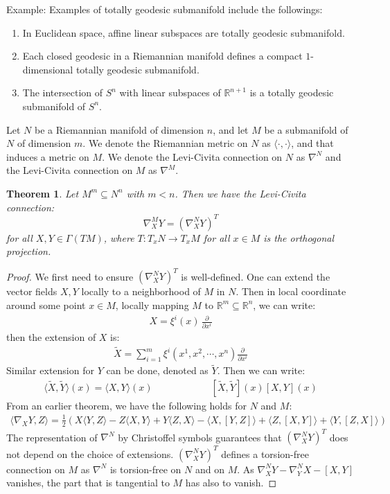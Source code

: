 \documentclass[11pt]{book}
\theoremstyle{break}
\theoremstyle{break}
\newtheorem{thm}{Theorem}[section]
\newcommand{\R}{\mathbb{R}}
\newcommand{\pd}{\partial}
\newcommand{\that}[1]{\widetilde{#1}}
\newcommand{\example}{\color{green}Example: \color{black}}
\begin{document}
\example Examples of totally geodesic submanifold include the followings:
\begin{enumerate}
\item In Euclidean space, affine linear subspaces are totally geodesic submanifold.
\item Each closed geodesic in a Riemannian manifold defines a compact $1$-dimensional totally geodesic submanifold. 
\item The intersection of $S^n$ with linear subspaces of $\R^{n+1}$ is a totally geodesic submanifold of $S^n$.  
\end{enumerate}


Let $N$ be a Riemannian manifold of dimension $n$, and let $M$ be a submanifold of $N$ of dimension $m$. We denote the Riemannian metric on $N$ as $\langle\cdot,\cdot\rangle$, and that induces a metric on $M$. We denote the Levi-Civita connection on $N$ as $\nabla^N$ and the Levi-Civita connection on $M$ as $\nabla^M$. 


\begin{thm}
Let $M^m \subseteq N^n$ with $m<n$. Then we have the Levi-Civita connection:
$$\nabla^M_XY = (\nabla_X^N Y)^T$$
for all $X,Y \in \Gamma(TM)$, where $T:T_xN \to T_xM$ for all $x \in M$ is the orthogonal projection. 
\end{thm}
\begin{proof}
We first need to ensure $(\nabla_X^N Y)^T$ is well-defined. One can extend the vector fields $X,Y$ locally to a neighborhood of $M$ in $N$. Then in local coordinate around some point $x \in M$, locally mapping $M$ to $\R^m \subseteq \R^n$, we can write:
\begin{align*}
X = \xi^i(x)\,\frac{\pd}{\pd x^i}
\end{align*}
then the extension of $X$ is:
\begin{align*}
\that{X} = \sum_{i=1}^m \xi^i (x^1,x^2,\cdots, x^n) \frac{\pd}{\pd x^i}
\end{align*}
Similar extension for $Y$ can be done, denoted as $\that{Y}$. Then we can write:
\begin{align*}
\langle \that{X},\that{Y}\rangle (x) = \langle X ,Y \rangle (x) \qquad \qquad\qquad [\that{X},\that{Y}](x) [X,Y](x)
\end{align*}
From an earlier theorem, we have the following holds for $N$ and $M$:
\begin{align*}
\langle \nabla_XY,Z\rangle = \frac{1}{2}\left( X\langle Y,Z\rangle - Z\langle X,Y\rangle  + Y\langle Z,X\rangle - \langle X,[Y,Z]\rangle + \langle Z, [X,Y]\rangle + \langle Y,[Z,X]\rangle \right)
\end{align*}
The representation of $\nabla^N$ by Christoffel symbols guarantees that $(\nabla_X^NY)^T$ does not depend on the choice of extensions. $(\nabla_X^NY)^T$ defines a torsion-free connection on $M$ as $\nabla^N$ is torsion-free on $N$ and on $M$. As $\nabla_X^NY - \nabla_Y^NX - [X,Y]$ vanishes, the part that is tangential to $M$ has also to vanish. 
\end{proof}
\end{document}
